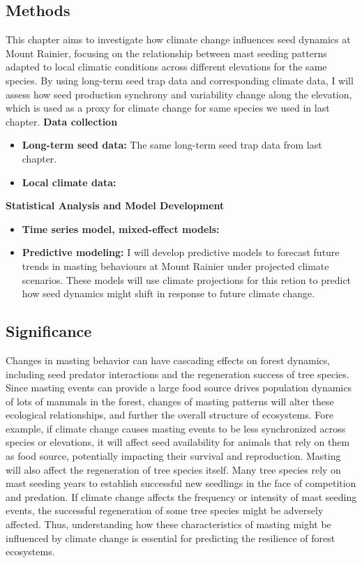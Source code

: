 \documentclass[11pt,letter]{article}
\begin{document}
\subsection{Methods}
This chapter aims to investigate how climate change influences seed dynamics at Mount Rainier, focusing on the relationship between mast seeding patterns adapted to local climatic conditions across different elevations for the same species. By using long-term seed trap data and corresponding climate data, I will assess how seed production synchrony and variability change along the elevation, which is used as a proxy for climate change for same species we used in last chapter.
\textbf{Data collection}\\
\begin{itemize}
\item\textbf{Long-term seed data:} The same long-term seed trap data from last chapter.
\item\textbf{Local climate data:}
\end{itemize}
\textbf{Statistical Analysis and Model Development}\\
\begin{itemize}
\item\textbf{Time series model, mixed-effect models:}
\item\textbf{Predictive modeling:} I will develop predictive models to forecast future trends in masting behaviours at Mount Rainier under projected climate scenarios. These models will use climate projections for this retion to predict how seed dynamics might shift in response to future climate change.
\end{itemize}
\subsection{Significance}
Changes in masting behavior can have cascading effects on forest dynamics, including seed predator interactions and the regeneration success of tree species. Since masting events can provide a large food source drives population dynamics of lots of mammals in the forest, changes of masting patterns will alter these ecological relationships, and further the overall structure of ecosystems. Fore example, if climate change causes masting events to be less synchronized across species or elevations, it will affect seed availability for animals that rely on them as food source, potentially impacting their survival and reproduction.
Masting will also affect the regeneration of tree species itself. Many tree species rely on mast seeding years to establish successful new seedlings in the face of competition and predation. If climate change affects the frequency or intensity of mast seeding events, the successful regeneration of some tree species might be adversely affected. Thus, understanding how these characteristics of masting might be influenced by climate change is essential for predicting the resilience of forest ecosystems.
\end{document}
